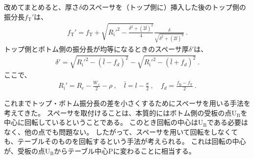 \begin{hosoku}
改めてまとめると、厚さ$\delta$のスペーサを（トップ側に）挿入した後のトップ側の振分長$f_\mathrm T'$は、
\begin{align*}
  f_\mathrm T'
  = f_\mathrm T+\sqrt{R_\mathrm i'^2-\frac{\delta^2+(2\bar l)^2}4}\frac\delta{\sqrt{\delta^2+(2\bar l)^2}}\ .
\end{align*}
トップ側とボトム側の振分長が均等になるときのスペーサ厚$\delta'$は、
\begin{align*}
  \delta' = \sqrt{R_\mathrm i'^2-(\bar l-f_d)^2}-\sqrt{R_\mathrm i'^2-(\bar l+f_d)^2}\ .
\end{align*}
ここで、
\begin{align*}
  R_\mathrm i' = R_\mathrm c-\frac{W_x}2-\rho\ ,\quad
  \bar l = l-\frac\sigma2\ ,\quad
  f_d = \frac{f_\mathrm B-f_\mathrm T}2\ .
\end{align*}
\end{hosoku}




\clearpage
これまでトップ・ボトム振分長の差を小さくするためにスペーサを用いる手法を考えてきた。
スペーサを取付けることは、本質的にはボトム側の受板の点U$_\mathrm B$を中心に回転しているということである。
このとき回転の中心はU$_\mathrm B$である必要はなく、他の点でも問題ない。
したがって、スペーサを用いて回転をしなくても、テーブルそのものを回転するという手法が考えられる。
これは回転の中心が、受板の点U$_\mathrm B$からテーブル中心Pに変わることに相当する。

